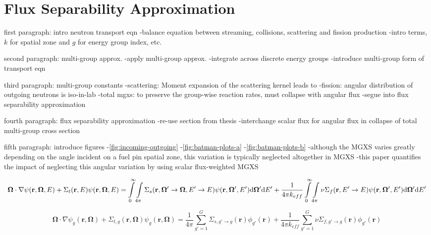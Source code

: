 \section{Flux Separability Approximation}
\label{sec:flux-separability}

first paragraph: intro neutron transport eqn
-balance equation between streaming, collisions, scattering and fission production
-intro terms, $k$ for spatial zone and $g$ for energy group index, etc.

second paragraph: multi-group approx.
-apply multi-group approx.
-integrate across discrete energy groups
-introduce multi-group form of transport eqn

third paragraph: multi-group constants
-scattering: Moment expansion of the scattering kernel leads to 
-fission: angular distribution of outgoing neutrons is iso-in-lab
-total mgxs: to preserve the group-wise reaction rates, must collapse with angular flux
  -segue into flux separability approximation

fourth paragraph: flux separability approximation
-re-use section from thesis
-interchange scalar flux for angular flux in collapse of total multi-group cross section

fifth paragraph: introduce figures
-\autoref{fig:incoming-outgoing} 
-\autoref{fig:batman-plots-a}
-\autoref{fig:batman-plots-b}
-although the MGXS varies greatly depending on the angle incident on a fuel pin spatial zone, this variation is typically neglected altogether in MGXS
-this paper quantifies the impact of neglecting this angular variation by using scalar flux-weighted MGXS

\begin{dmath}
\label{eqn:transport-eqn-ce}
\mathbf{\Omega} \cdot \nabla \psi(\mathbf{r},\mathbf{\Omega},E) + \Sigma_{t}(\mathbf{r},E)\psi(\mathbf{r},\mathbf{\Omega},E) = \int\displaylimits_{0}^{\infty}\int\displaylimits_{4\pi} \Sigma_{s}(\mathbf{r},{\mathbf{\Omega'}\rightarrow\mathbf{\Omega}},{E'\rightarrow E}) \psi(\mathbf{r},\mathbf{\Omega'},E') \mathrm{d}\mathbf{\Omega'} \mathrm{d}E' + \frac{1}{4\pi k_{eff}}\int\displaylimits_{0}^{\infty}\int\displaylimits_{4\pi} \nu\Sigma_{f}(\mathbf{r},{E'\rightarrow E})\psi(\mathbf{r},\mathbf{\Omega'},E') \mathrm{d}\mathbf{\Omega'} \mathrm{d}E'
\end{dmath}

\begin{dmath}
\label{eqn:transport-eqn-mg}
\mathbf{\Omega} \cdot \nabla \psi_{g}(\mathbf{r},\mathbf{\Omega}) + \Sigma_{t,g}(\mathbf{r},\mathbf{\Omega})\psi_{g}(\mathbf{r},\mathbf{\Omega}) =
\frac{1}{4\pi}\sum_{g'=1}^{G} \Sigma_{s,g' \rightarrow g}(\mathbf{r}) \phi_{g'}(\mathbf{r}) + \frac{1}{4\pi k_{eff}}\sum_{g'=1}^{G} \nu\Sigma_{f,g' \rightarrow g}(\mathbf{r})\phi_{g'}(\mathbf{r})
\end{dmath}


